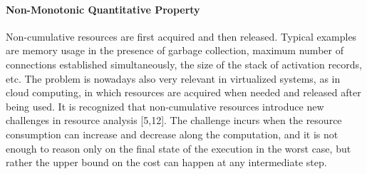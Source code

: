 \paragraph*{Non-Monotonic Quantitative Property}

Non-cumulative resources are first acquired and then released.
Typical examples are memory usage in the presence of garbage collection, maximum number of connections established simultaneously, the size of the stack of activation records, etc.
The problem is nowadays also very relevant in virtualized systems, as in cloud computing, 
in which resources are acquired when needed and released after being used.
It is recognized that non-cumulative resources introduce new challenges in resource analysis [5,12].
The challenge incurs when the resource consumption can increase and decrease along the computation, 
and it is not enough to reason only on the final state of the execution in the worst case,
but rather the upper bound on the cost can happen at any intermediate step.

